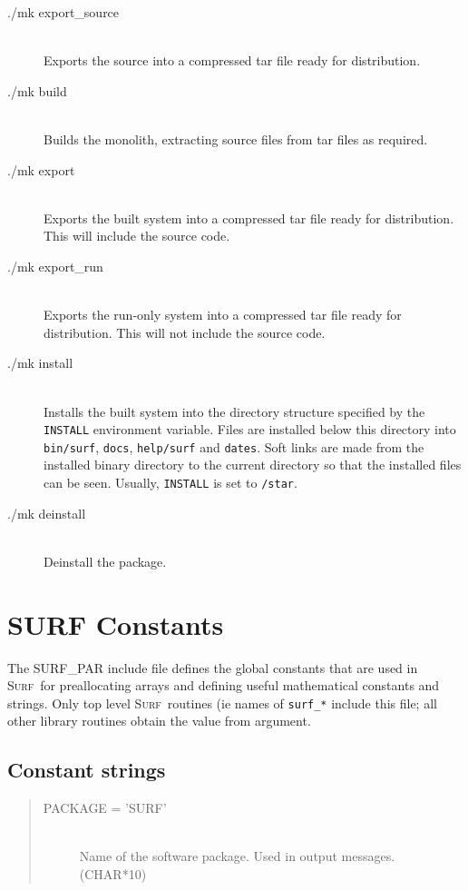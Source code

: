 \documentclass[twoside,11pt,nolof]{starlink}
\providecommand{\scusoft}          {\textsc{Surf}}
\begin{document}
\begin{description}

\item[./mk export\_source] \mbox{} \\
   Exports the source into a compressed tar file ready for distribution.
\item[./mk build] \mbox{} \\
   Builds the monolith, extracting source files from tar files as required.
\item[./mk export] \mbox{} \\
   Exports the built system into a compressed tar file ready for distribution.
This will include the source code.
\item[./mk export\_run] \mbox{} \\
   Exports the run-only system into a compressed tar file ready for
distribution. This will not include the source code.
\item[./mk install] \mbox{} \\
  Installs the built system into the directory structure specified by the
\texttt{INSTALL} environment variable. Files are installed below this
directory into \texttt{bin/surf}, \texttt{docs}, \texttt{help/surf}
and \texttt{dates}. Soft links are made from the installed binary directory
to the current directory so that the installed files can be seen.
Usually, \texttt{INSTALL} is set to \texttt{/star}.
\item[./mk deinstall] \mbox{} \\
  Deinstall the package.
\end{description}

\section{SURF Constants\label{app:const}}

The SURF\_PAR include file defines the global constants that are used
in \scusoft\ for preallocating arrays and defining useful mathematical
constants and strings. Only top level \scusoft\ routines (ie names of
\texttt{surf\_*} include this file; all other library routines
obtain the value from argument.

\subsection{Constant strings}

\begin{quote}
\begin{description}
  \item[PACKAGE = 'SURF'] \mbox{} \\
    Name of the software package. Used in output messages. (CHAR*10)
\end{description}
\end{quote}
\end{document}

